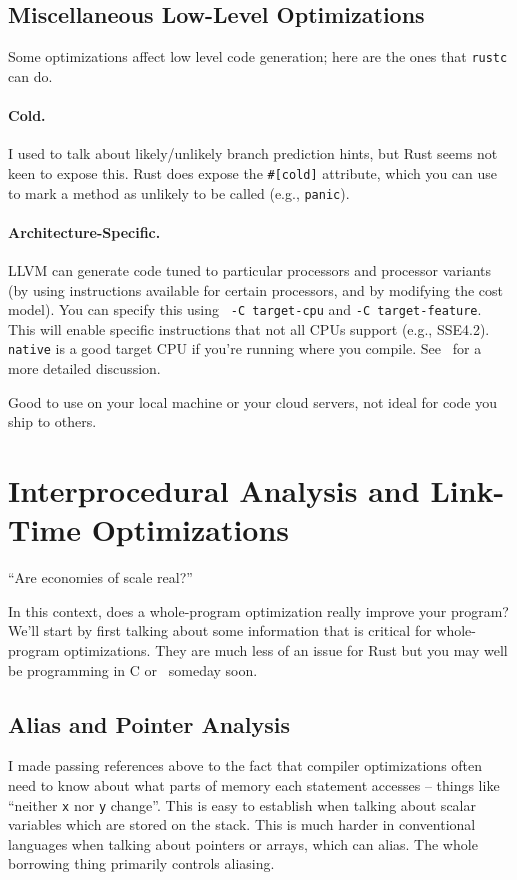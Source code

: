\subsection*{Miscellaneous Low-Level Optimizations}
Some optimizations affect low level code generation; here are the ones that
{\tt rustc} can do.

\paragraph{Cold.} I used to talk about likely/unlikely branch prediction hints,
but Rust seems not keen to expose this. Rust does expose the \verb+#[cold]+
attribute, which you can use to mark a method as unlikely to be called (e.g., \texttt{panic}).

\paragraph{Architecture-Specific.} LLVM can generate code tuned to particular
processors and processor variants (by using instructions available for certain processors,
and by modifying the cost model). You can specify this using {\tt
  -C target-cpu} and {\tt -C target-feature}.
This will enable specific instructions that not all CPUs support (e.g., SSE4.2).
{\tt native} is a good target CPU if you're running where you compile.
See~\cite{wilcox20:_target_featur_target_cpu_rust}
for a more detailed discussion. 

\noindent
Good to use on your local machine or your cloud servers, not ideal for code you ship to others.


\section*{Interprocedural Analysis and Link-Time Optimizations}
\hfill ``Are economies of scale real?''

In this context, does a
whole-program optimization really improve your program?
We'll start by first talking about some information that is critical for
whole-program optimizations. They are much less of an issue for Rust but
you may well be programming in C or \CPP~someday soon.

\subsection*{Alias and Pointer Analysis}
I made passing references above to the fact that compiler optimizations often need
to know about what parts of memory each statement accesses -- things like ``neither
{\tt x} nor {\tt y} change''. This is
easy to establish when talking about scalar variables which are stored on the
stack. This is much harder in conventional languages when talking about pointers or arrays, which can alias. The whole borrowing thing primarily controls aliasing.

